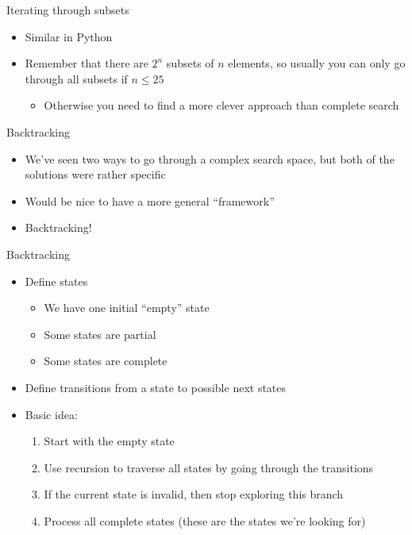 \documentclass[10pt]{beamer}
\newcommand{\bi}{\begin{itemize}}
\newcommand{\ei}{\end{itemize}}
\begin{document}
\begin{frame}{Iterating through subsets}
    \bi
        \item Similar in Python
        \vspace{20pt}
        \item Remember that there are $2^n$ subsets of $n$ elements, so usually you can only go through all subsets if $n \leq 25$
            \bi
                \item Otherwise you need to find a more clever approach than complete search
            \ei
            \vspace{20pt}
    \ei
\end{frame}


\begin{frame}[fragile]{Backtracking}
    \bi
        \item We've seen two ways to go through a complex search space, but both of the solutions were rather specific
        \item Would be nice to have a more general ``framework''
        \vspace{10pt}
        \item Backtracking!
    \ei
\end{frame}

\begin{frame}[fragile]{Backtracking}
    \bi
        \item Define states
            \bi
                \item We have one initial ``empty'' state
                \item Some states are partial
                \item Some states are complete
            \ei
        \vspace{10pt}
        \item Define transitions from a state to possible next states
        \vspace{10pt}
        \item Basic idea:
            \begin{enumerate}
                \item Start with the empty state
                \item Use recursion to traverse all states by going through the transitions
                \item If the current state is invalid, then stop exploring this branch
                \item Process all complete states (these are the states we're looking for)
            \end{enumerate}
    \ei
\end{frame}
\end{document}
